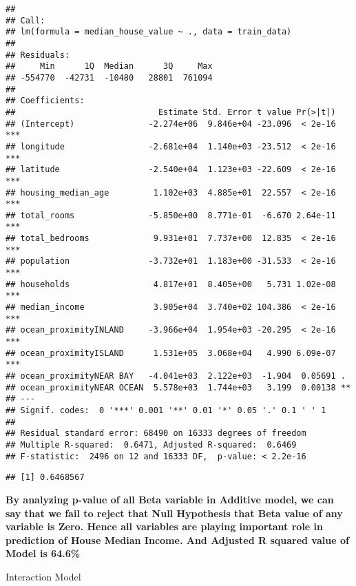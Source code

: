 \documentclass[
]{article}
\newenvironment{Shaded}{\begin{snugshade}}{\end{snugshade}}
\newcommand{\DataTypeTok}[1]{\textcolor[rgb]{0.13,0.29,0.53}{#1}}
\newcommand{\DecValTok}[1]{\textcolor[rgb]{0.00,0.00,0.81}{#1}}
\newcommand{\KeywordTok}[1]{\textcolor[rgb]{0.13,0.29,0.53}{\textbf{#1}}}
\newcommand{\NormalTok}[1]{#1}
\newcommand{\OperatorTok}[1]{\textcolor[rgb]{0.81,0.36,0.00}{\textbf{#1}}}
\newcommand{\StringTok}[1]{\textcolor[rgb]{0.31,0.60,0.02}{#1}}
\begin{document}
\begin{verbatim}
## 
## Call:
## lm(formula = median_house_value ~ ., data = train_data)
## 
## Residuals:
##     Min      1Q  Median      3Q     Max 
## -554770  -42731  -10480   28801  761094 
## 
## Coefficients:
##                             Estimate Std. Error t value Pr(>|t|)    
## (Intercept)               -2.274e+06  9.846e+04 -23.096  < 2e-16 ***
## longitude                 -2.681e+04  1.140e+03 -23.512  < 2e-16 ***
## latitude                  -2.540e+04  1.123e+03 -22.609  < 2e-16 ***
## housing_median_age         1.102e+03  4.885e+01  22.557  < 2e-16 ***
## total_rooms               -5.850e+00  8.771e-01  -6.670 2.64e-11 ***
## total_bedrooms             9.931e+01  7.737e+00  12.835  < 2e-16 ***
## population                -3.732e+01  1.183e+00 -31.533  < 2e-16 ***
## households                 4.817e+01  8.405e+00   5.731 1.02e-08 ***
## median_income              3.905e+04  3.740e+02 104.386  < 2e-16 ***
## ocean_proximityINLAND     -3.966e+04  1.954e+03 -20.295  < 2e-16 ***
## ocean_proximityISLAND      1.531e+05  3.068e+04   4.990 6.09e-07 ***
## ocean_proximityNEAR BAY   -4.041e+03  2.122e+03  -1.904  0.05691 .  
## ocean_proximityNEAR OCEAN  5.578e+03  1.744e+03   3.199  0.00138 ** 
## ---
## Signif. codes:  0 '***' 0.001 '**' 0.01 '*' 0.05 '.' 0.1 ' ' 1
## 
## Residual standard error: 68490 on 16333 degrees of freedom
## Multiple R-squared:  0.6471, Adjusted R-squared:  0.6469 
## F-statistic:  2496 on 12 and 16333 DF,  p-value: < 2.2e-16
\end{verbatim}

\begin{Shaded}
\end{Shaded}

\begin{verbatim}
## [1] 0.6468567
\end{verbatim}

\textbf{By analyzing p-value of all Beta variable in Additive model, we
can say that we fail to reject that Null Hypothesis that Beta value of
any variable is Zero. Hence all variables are playing important role in
prediction of House Median Income. And Adjusted R squared value of Model
is 64.6\%}

{Interaction Model}

\begin{Shaded}
\end{Shaded}
\end{document}
